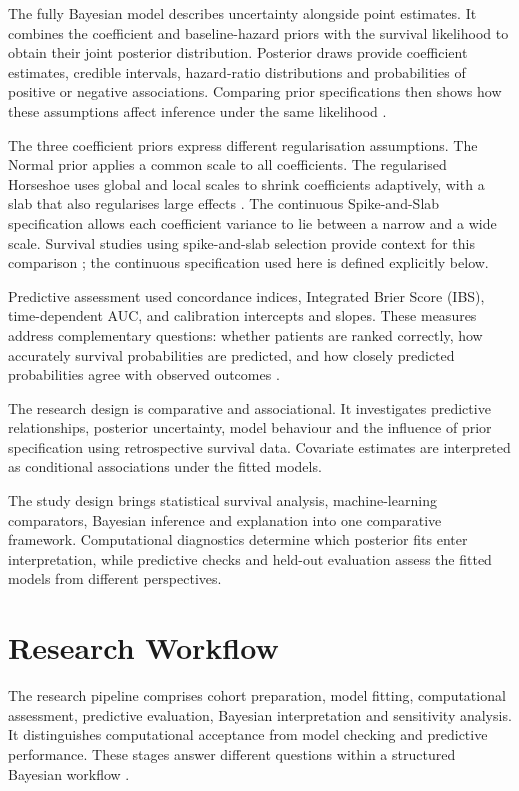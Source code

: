 The fully Bayesian model describes uncertainty alongside point estimates. It combines the coefficient and baseline-hazard priors with the survival likelihood to obtain their joint posterior distribution. Posterior draws provide coefficient estimates, credible intervals, hazard-ratio distributions and probabilities of positive or negative associations. Comparing prior specifications then shows how these assumptions affect inference under the same likelihood \cite{ref40}.

The three coefficient priors express different regularisation assumptions. The Normal prior applies a common scale to all coefficients. The regularised Horseshoe uses global and local scales to shrink coefficients adaptively, with a slab that also regularises large effects \cite{carvalho2010,piironen2017}. The continuous Spike-and-Slab specification allows each coefficient variance to lie between a narrow and a wide scale. Survival studies using spike-and-slab selection provide context for this comparison \cite{ref25,ref42,ref43}; the continuous specification used here is defined explicitly below.

Predictive assessment used concordance indices, Integrated Brier Score (IBS), time-dependent AUC, and calibration intercepts and slopes. These measures address complementary questions: whether patients are ranked correctly, how accurately survival probabilities are predicted, and how closely predicted probabilities agree with observed outcomes \cite{ref26,ref27}.

The research design is comparative and associational. It investigates predictive relationships, posterior uncertainty, model behaviour and the influence of prior specification using retrospective survival data. Covariate estimates are interpreted as conditional associations under the fitted models.

The study design brings statistical survival analysis, machine-learning comparators, Bayesian inference and explanation into one comparative framework. Computational diagnostics determine which posterior fits enter interpretation, while predictive checks and held-out evaluation assess the fitted models from different perspectives.

\section{Research Workflow}\label{research-workflow}

The research pipeline comprises cohort preparation, model fitting, computational assessment, predictive evaluation, Bayesian interpretation and sensitivity analysis. It distinguishes computational acceptance from model checking and predictive performance. These stages answer different questions within a structured Bayesian workflow \cite{ref53}.

